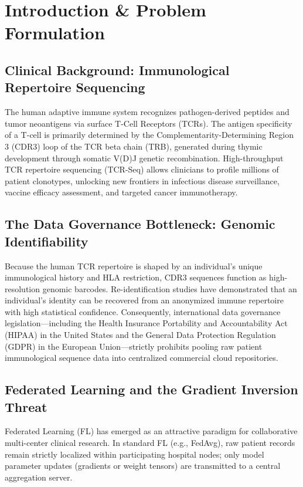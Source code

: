 \documentclass[11pt,a4paper]{report}
\begin{document}
\newpage
\tableofcontents
\listoffigures
\listoftables
\newpage

\chapter{Introduction \& Problem Formulation}
\label{chap:intro}

\section{Clinical Background: Immunological Repertoire Sequencing}
The human adaptive immune system recognizes pathogen-derived peptides and tumor neoantigens via surface T-Cell Receptors (TCRs). The antigen specificity of a T-cell is primarily determined by the Complementarity-Determining Region 3 (CDR3) loop of the TCR beta chain (TRB), generated during thymic development through somatic V(D)J genetic recombination. High-throughput TCR repertoire sequencing (TCR-Seq) allows clinicians to profile millions of patient clonotypes, unlocking new frontiers in infectious disease surveillance, vaccine efficacy assessment, and targeted cancer immunotherapy.

\section{The Data Governance Bottleneck: Genomic Identifiability}
Because the human TCR repertoire is shaped by an individual's unique immunological history and HLA restriction, CDR3 sequences function as high-resolution genomic barcodes. Re-identification studies have demonstrated that an individual's identity can be recovered from an anonymized immune repertoire with high statistical confidence. Consequently, international data governance legislation—including the Health Insurance Portability and Accountability Act (HIPAA) in the United States and the General Data Protection Regulation (GDPR) in the European Union—strictly prohibits pooling raw patient immunological sequence data into centralized commercial cloud repositories.

\section{Federated Learning and the Gradient Inversion Threat}
Federated Learning (FL) has emerged as an attractive paradigm for collaborative multi-center clinical research. In standard FL (e.g., FedAvg), raw patient records remain strictly localized within participating hospital nodes; only model parameter updates (gradients or weight tensors) are transmitted to a central aggregation server.
\end{document}
